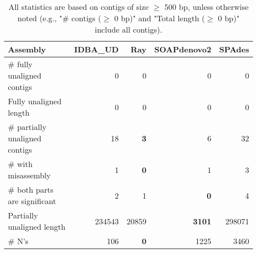 \documentclass[12pt,a4paper]{article}
\begin{document}
\begin{table}[ht]
\begin{center}
\caption{All statistics are based on contigs of size $\geq$ 500 bp, unless otherwise noted (e.g., "\# contigs ($\geq$ 0 bp)" and "Total length ($\geq$ 0 bp)" include all contigs).}
\begin{tabular}{|l*{4}{|r}|}
\hline
Assembly & IDBA\_UD & Ray & SOAPdenovo2 & SPAdes \\ \hline
\# fully unaligned contigs & 0 & 0 & 0 & 0 \\ \hline
Fully unaligned length & 0 & 0 & 0 & 0 \\ \hline
\# partially unaligned contigs & 18 & {\bf 3} & 6 & 32 \\ \hline
\hspace{5mm}\# with misassembly & 1 & {\bf 0} & 1 & 3 \\ \hline
\hspace{5mm}\# both parts are significant & 2 & 1 & {\bf 0} & 4 \\ \hline
Partially unaligned length & 234543 & 20859 & {\bf 3101} & 298071 \\ \hline
\# N's & 106 & {\bf 0} & 1225 & 3460 \\ \hline
\end{tabular}
\end{center}
\end{table}
\end{document}
